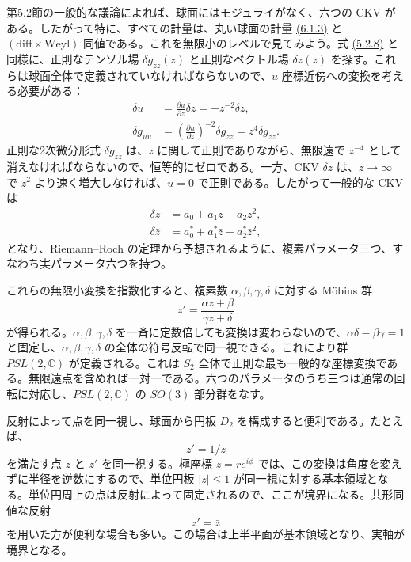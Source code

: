 第5.2節の一般的な議論によれば、球面にはモジュライがなく、六つの CKV がある。したがって特に、すべての計量は、丸い球面の計量 \hyperref[eq:6.1.3]{(6.1.3)} と $(\mathrm{diff}\times\mathrm{Weyl})$ 同値である。これを無限小のレベルで見てみよう。式 \hyperref[eq:5.2.8a]{(5.2.8)} と同様に、正則なテンソル場 $\delta g_{zz}(z)$ と正則なベクトル場 $\delta z(z)$ を探す。これらは球面全体で定義されていなければならないので、$u$ 座標近傍への変換を考える必要がある：
\begin{align}
\delta u&=\frac{\partial u}{\partial z}\delta z=-z^{-2}\delta z,
\tag{6.1.4a}\label{eq:6.1.4a}\\
\delta g_{uu}&=\left(\frac{\partial u}{\partial z}\right)^{-2}\delta g_{zz}=z^4\delta g_{zz}.
\tag{6.1.4b}\label{eq:6.1.4b}
\end{align}
正則な2次微分形式 $\delta g_{zz}$ は、$z$ に関して正則でありながら、無限遠で $z^{-4}$ として消えなければならないので、恒等的にゼロである。一方、CKV $\delta z$ は、$z\to\infty$ で $z^2$ より速く増大しなければ、$u=0$ で正則である。したがって一般的な CKV は
\begin{align}
\delta z&=a_0+a_1z+a_2z^2,
\tag{6.1.5a}\label{eq:6.1.5a}\\
\delta\bar z&=a_0^*+a_1^*\bar z+a_2^*\bar z^2,
\tag{6.1.5b}\label{eq:6.1.5b}
\end{align}
となり、Riemann--Roch の定理から予想されるように、複素パラメータ三つ、すなわち実パラメータ六つを持つ。

これらの無限小変換を指数化すると、複素数 $\alpha,\beta,\gamma,\delta$ に対する Möbius 群
\begin{equation}
z'=\frac{\alpha z+\beta}{\gamma z+\delta}
\tag{6.1.6}\label{eq:6.1.6}
\end{equation}
が得られる。$\alpha,\beta,\gamma,\delta$ を一斉に定数倍しても変換は変わらないので、$\alpha\delta-\beta\gamma=1$ と固定し、$\alpha,\beta,\gamma,\delta$ の全体の符号反転で同一視できる。これにより群 $PSL(2,\mathbb C)$ が定義される。これは $S_2$ 全体で正則な最も一般的な座標変換である。無限遠点を含めれば一対一である。六つのパラメータのうち三つは通常の回転に対応し、$PSL(2,\mathbb C)$ の $SO(3)$ 部分群をなす。


反射によって点を同一視し、球面から円板 $D_2$ を構成すると便利である。たとえば、
\begin{equation}
z'=1/\bar z
\tag{6.1.7}\label{eq:6.1.7}
\end{equation}
を満たす点 $z$ と $z'$ を同一視する。極座標 $z=re^{i\phi}$ では、この変換は角度を変えずに半径を逆数にするので、単位円板 $|z|\leq1$ が同一視に対する基本領域となる。単位円周上の点は反射によって固定されるので、ここが境界になる。共形同値な反射
\begin{equation}
z'=\bar z
\tag{6.1.8}\label{eq:6.1.8}
\end{equation}
を用いた方が便利な場合も多い。この場合は上半平面が基本領域となり、実軸が境界となる。

